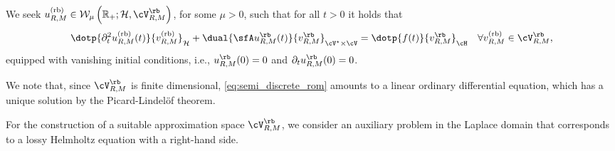 \begin{problem} \label{pr:sdpr}
We seek $u^{\normalfont\textrm{(rb)}}_{R,M} \in \mathcal{W}_\mu\left(\mathbb{R}_+;\mathcal{H},\cV_{R,M}^\rb\right)$, for some $\mu>0$, such that for all $t>0$ it holds that
\begin{equation}\label{eq:semi_discrete_rom}
\begin{aligned}
	\dotp{
		\partial^2_t
		u_{R,M}^{\normalfont\textrm{(rb)}}(t)
	}{
		v_{R,M}^{\normalfont\textrm{(rb)}}
	}_{\mathcal{H}}
	+ 
    \dual{\sfA u_{R,M}^\rb(t)}{v_{R,M}^\rb}_{\cV^\star\times\cV} = \dotp{f(t)}{v_{R,M}^\rb}_\cH
	\quad
	\forall v_{R,M}^{\normalfont\textrm{(rb)}} \in \cV_{R,M}^\rb,
\end{aligned}
\end{equation}
equipped with vanishing initial conditions, i.e., 
$u_{R,M}^\rb(0)=0$ and $\partial_t u_{R,M}^\rb(0)=0$. 
\end{problem}

We note that, since $\cV_{R,M}^\rb$ is finite dimensional, \eqref{eq:semi_discrete_rom} amounts to a linear ordinary differential equation, which has a unique solution by the Picard-Lindel\"of theorem.

For the construction of a suitable approximation space $\cV_{R,M}^\rb$, we consider an auxiliary problem in the Laplace domain that corresponds to a lossy Helmholtz equation
with a right-hand side.

